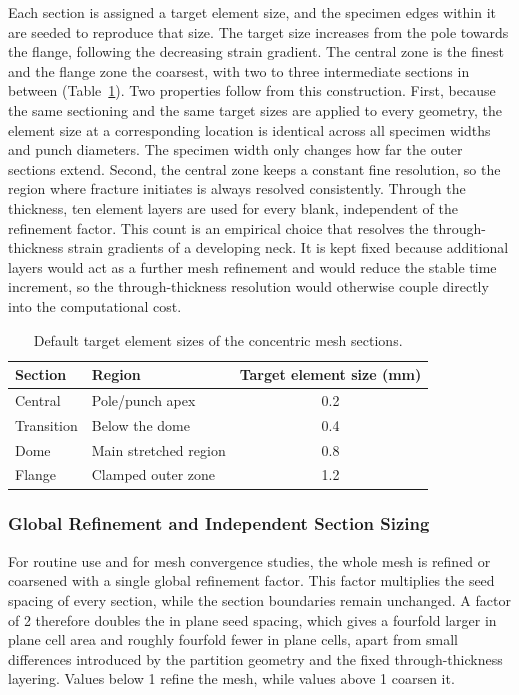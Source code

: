 Each section is assigned a target element size, and the specimen edges within it
are seeded to reproduce that size. The target size increases from the pole
towards the flange, following the decreasing strain gradient. The central zone
is the finest and the flange zone the coarsest, with two to three intermediate sections
in between (Table~\ref{tab:mesh_zones}). Two properties follow from this
construction. First, because the same sectioning and the same target sizes are
applied to every geometry, the element size at a corresponding location is
identical across all specimen widths and punch diameters. The specimen width
only changes how far the outer sections extend. Second, the central zone keeps a
constant fine resolution, so the region where fracture initiates is always
resolved consistently. Through the thickness, ten element layers are used for
every blank, independent of the refinement factor. This count is an empirical
choice that resolves the through-thickness strain gradients of a developing
neck. It is kept fixed because additional layers would act as a further mesh
refinement and would reduce the stable time increment, so the
through-thickness resolution would otherwise couple directly into the computational
cost.

\begin{table}[H]
\centering
\begin{tabular}{@{}llc@{}}\toprule
Section & Region & Target element size (\si{\milli\meter}) \\ \midrule
Central & Pole/punch apex   & 0.2 \\
Transition & Below the dome    & 0.4 \\
Dome & Main stretched region   & 0.8 \\
Flange & Clamped outer zone    & 1.2 \\ \bottomrule
\end{tabular}
\caption{Default target element sizes of the concentric mesh sections.}
\label{tab:mesh_zones}
\end{table}

\subsubsection{Global Refinement and Independent Section Sizing}

For routine use and for mesh convergence studies, the whole mesh is refined or
coarsened with a single global refinement factor. This factor multiplies the
seed spacing of every section, while the section boundaries remain unchanged.
A factor of \num{2} therefore doubles the in plane seed spacing, which gives a
fourfold larger in plane cell area and roughly fourfold fewer in plane cells,
apart from small differences introduced by the partition geometry and the
fixed through-thickness layering. Values below \num{1} refine the mesh, while
values above \num{1} coarsen it.

